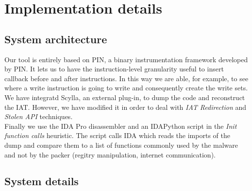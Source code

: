 \chapter{Implementation details}
\label{chapter4}
\thispagestyle{empty}

\section{System architecture}
Our tool is entirely based on PIN, a binary instrumentation framework developed by PIN. It lets us to have the instruction-level granularity useful to insert callback before and after instructions. In this way we are able, for example, to see where a write instruction is going to write and consequently create the write sets.\\
We have integratd Scylla, an external plug-in, to dump the code and reconstruct the IAT. However, we have modified it in order to deal with \textit{IAT Redirection} and \textit{Stolen API} techniques.\\
Finally we use the IDA Pro disassembler and an IDAPython script in the \textit{Init function calls} heuristic. The script calls IDA which reads the imports of the dump and compare them to a list of functions commonly used by the malware and not by the packer (regitry manipulation, internet communication).

\section{System details}